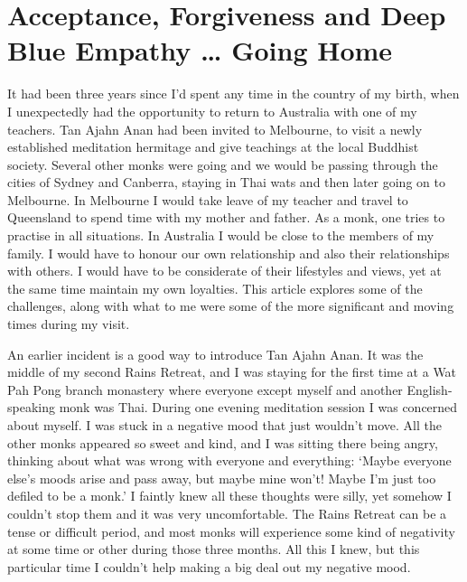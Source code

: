 

\chapter{Acceptance, Forgiveness and Deep Blue Empathy \ldots{} Going Home}
\markright{\chapterAuthor}

It had been three years since I'd spent any time in the country of my
birth, when I unexpectedly had the opportunity to return to Australia
with one of my teachers. Tan Ajahn Anan had been invited to Melbourne,
to visit a newly established meditation hermitage and give teachings at
the local Buddhist society. Several other monks were going and we would
be passing through the cities of Sydney and Canberra, staying in Thai
wats and then later going on to Melbourne. In Melbourne I would take
leave of my teacher and travel to Queensland to spend time with my
mother and father. As a monk, one tries to practise in all situations.
In Australia I would be close to the members of my family. I would have
to honour our own relationship and also their relationships with others.
I would have to be considerate of their lifestyles and views, yet at the
same time maintain my own loyalties. This article explores some of the
challenges, along with what to me were some of the more significant and
moving times during my visit.

An earlier incident is a good way to introduce Tan Ajahn Anan. It was
the middle of my second Rains Retreat, and I was staying for the first
time at a Wat Pah Pong branch monastery where everyone except myself and
another English-speaking monk was Thai. During one evening meditation
session I was concerned about myself. I was stuck in a negative mood
that just wouldn't move. All the other monks appeared so sweet and kind,
and I was sitting there being angry, thinking about what was wrong with
everyone and everything: `Maybe everyone else's moods arise and pass
away, but maybe mine won't! Maybe I'm just too defiled to be a monk.' I
faintly knew all these thoughts were silly, yet somehow I couldn't stop
them and it was very uncomfortable. The Rains Retreat can be a tense or
difficult period, and most monks will experience some kind of negativity
at some time or other during those three months. All this I knew, but
this particular time I couldn't help making a big deal out my negative
mood.

